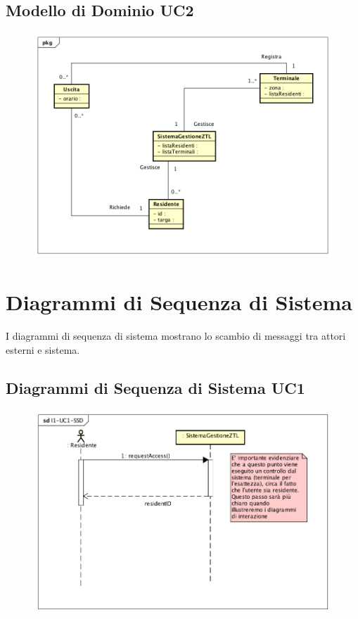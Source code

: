 \documentclass[12pt, letterpaper]{article}
\begin{document}
\subsection{Modello di Dominio UC2}
\begin{figure}[H]
    \centering
    \includegraphics[scale=0.50]{I1-UC2-DM}
    \label{fig:mesh1}
\end{figure}

\section{Diagrammi di Sequenza di Sistema}
I diagrammi di sequenza di sistema mostrano
lo scambio di messaggi tra attori esterni 
e sistema. 

\subsection{Diagrammi di Sequenza di Sistema UC1}
\begin{figure}[H]
    \centering
    \includegraphics[scale=0.50]{I1-UC1-SSD}
    \label{fig:mesh1}
\end{figure}
\end{document}
